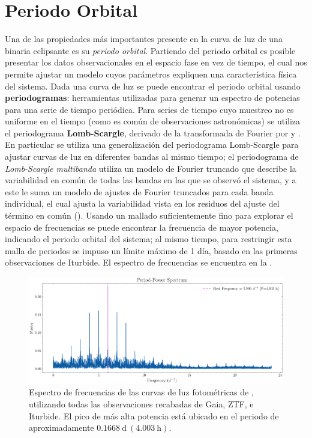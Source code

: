 \chapter{Periodo Orbital} \label{metodologia:analisisperiodo}

Una de las propiedades más importantes presente en la curva de luz de una
binaria eclipsante es su \textit{periodo orbital}. Partiendo del periodo orbital
es posible presentar los datos observacionales en el espacio fase en vez de
tiempo, el cual nos permite ajustar un modelo cuyos parámetros expliquen una
característica física del sistema. Dada una curva de luz se puede encontrar el
periodo orbital usando \textbf{periodogramas}: herramientas utilizadas para
generar un espectro de potencias para una serie de tiempo periódica. Para series
de tiempo cuyo muestreo no es uniforme en el tiempo (como es común de
observaciones astronómicas) se utiliza el periodograma \textbf{Lomb-Scargle},
derivado de la transformada de Fourier por
 y
. En particular se
utiliza una generalización del periodograma Lomb-Scargle para
ajustar curvas de luz en diferentes bandas al mismo tiempo; el periodograma de
\textit{Lomb-Scargle multibanda} utiliza un modelo de Fourier truncado que
describe la variabilidad en común de todas las bandas en las que se observó el
sistema, y a este le suma un modelo de ajustes de Fourier truncados para cada
banda individual, el cual ajusta la variabilidad vista en los residuos del
ajuste del término en común
(). Usando un
mallado suficientemente fino para explorar el espacio de frecuencias se puede
encontrar la frecuencia de mayor potencia, indicando el periodo orbital del
sistema; al mismo tiempo, para restringir esta malla de periodos se impuso un
límite máximo de 1 día, basado en las primeras observaciones de Iturbide. El
espectro de frecuencias se encuentra en la . 

\begin{figure}[!ht]
	\centering
	\includegraphics[scale=0.45]{Metodologia/Secciones/AnalisisPeriodo/Figures/LS Power Spectrum.png}
	
	\caption{Espectro de frecuencias de las curvas de luz fotométricas de
	\atoObjIdNoSpace, utilizando todas las observaciones recabadas de Gaia, ZTF,
	e Iturbide. El pico de más alta potencia está ubicado en el periodo de
	aproximadamente $0.1668 \ \mathrm{d} \ (4.003 \ \mathrm{h})$.} 
	\label{periodogramaLSFrecs}
\end{figure}

